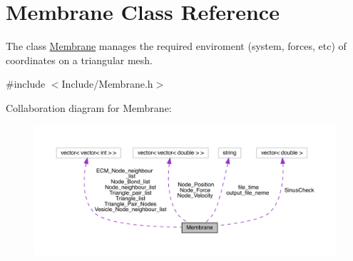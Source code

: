 \hypertarget{classMembrane}{}\section{Membrane Class Reference}
\label{classMembrane}


The class \textquotesingle{}\mbox{\hyperlink{classMembrane}{Membrane}}\textquotesingle{} manages the required enviroment (system, forces, etc) of coordinates on a triangular mesh.  




{\ttfamily \#include $<$Include/\+Membrane.\+h$>$}



Collaboration diagram for Membrane\+:
\nopagebreak
\begin{figure}[H]
\begin{center}
\leavevmode
\includegraphics[width=350pt]{classMembrane__coll__graph}
\end{center}
\end{figure}
